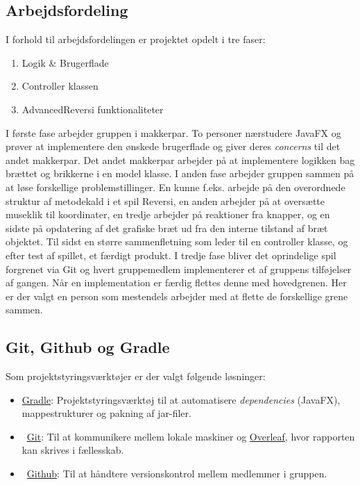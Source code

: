 \subsection{Arbejdsfordeling}
I forhold til arbejdsfordelingen er projektet opdelt i tre faser:
\begin{enumerate}
    \item Logik \& Brugerflade
    \item Controller klassen
    \item AdvancedReversi funktionaliteter
\end{enumerate}
I første fase arbejder gruppen i makkerpar. To personer nærstudere JavaFX og prøver at implementere den ønskede brugerflade og giver deres \emph{concerns} til det andet makkerpar. Det andet makkerpar arbejder på at implementere logikken bag brættet og brikkerne i en model klasse.\newline
I anden fase arbejder gruppen sammen på at løse forskellige problemstillinger. En kunne f.eks. arbejde på den overordnede struktur af metodekald i et spil Reversi, en anden arbejder på at oversætte museklik til koordinater, en tredje arbejder på reaktioner fra knapper, og en sidste på opdatering af det grafiske bræt ud fra den interne tilstand af bræt objektet. Til sidst en større sammenfletning som leder til en controller klasse, og efter test af spillet, et færdigt produkt.
I tredje fase bliver det oprindelige spil forgrenet via Git og hvert gruppemedlem implementerer et af gruppens tilføjelser af gangen. Når en implementation er færdig flettes denne med hovedgrenen. Her er der valgt en person som mestendels arbejder med at flette de forskellige grene sammen.
\subsection{Git, Github og Gradle}\label{sec:GGG}
Som projektstyringsværktøjer er der valgt følgende løsninger:
\begin{itemize}
    \item \href{https://gradle.org/}{Gradle}: Projektstyringsværktøj til at automatisere \emph{dependencies} (JavaFX), mappestrukturer og pakning af jar-filer.
    \item \faGit \ \href{https://git-scm.com/}{Git}: Til at kommunikere mellem lokale maskiner og \href{https://www.overleaf.com/}{Overleaf}, hvor rapporten kan skrives i fællesskab.
    \item \faGithub \ \href{https://github.com/}{Github}: Til at håndtere versionskontrol mellem medlemmer i gruppen.
\end{itemize}
